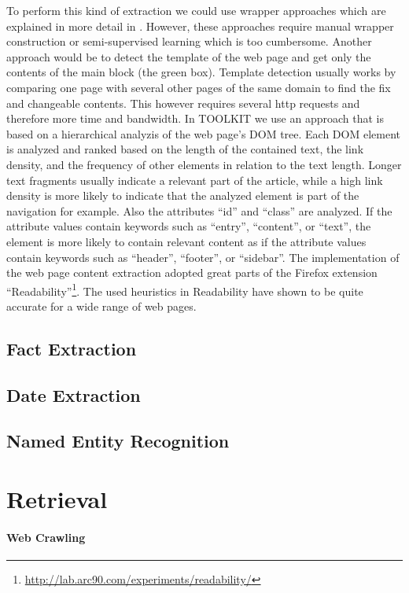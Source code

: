\documentclass[a4paper,twoside]{book}      %
\begin{document}
To perform this kind of extraction we could use wrapper approaches which are explained in more detail in \cite{ckcs06}. However, these approaches require manual wrapper construction or semi-supervised learning which is too cumbersome.
Another approach would be to detect the template of the web page and get only the contents of the main block (the green box). Template detection usually works by comparing one page with several other pages of the same domain to find the fix and changeable contents. This however requires several http requests and therefore more time and bandwidth.
In TOOLKIT we use an approach that is based on a hierarchical analyzis of the web page's DOM tree. Each DOM element is analyzed and ranked based on the length of the contained text, the link density, and the frequency of other elements in relation to the text length. Longer text fragments usually indicate a relevant part of the article, while a high link density is more likely to indicate that the analyzed element is part of the navigation for example. Also the attributes ``id'' and ``class'' are analyzed. If the attribute values contain keywords such as ``entry'', ``content'', or ``text'', the element is more likely to contain relevant content as if the attribute values contain keywords such as ``header'', ``footer'', or ``sidebar''. The implementation of the web page content extraction adopted great parts of the Firefox extension ``Readability''\footnote{\url{http://lab.arc90.com/experiments/readability/}}. The used heuristics in Readability have shown to be quite accurate for a wide range of web pages.

\subsection{Fact Extraction}
\subsection{Date Extraction}
\subsection{Named Entity Recognition}

\section{Retrieval}
\paragraph{Web Crawling}
\end{document}
